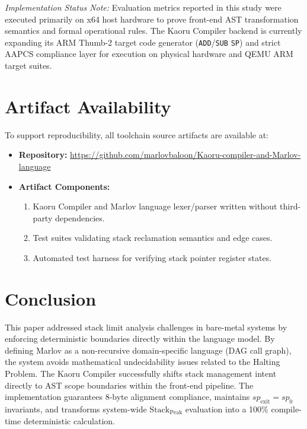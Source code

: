 \documentclass[conference]{IEEEtran}
\begin{document}
\textit{Implementation Status Note:} Evaluation metrics reported in this study were executed primarily on x64 host hardware to prove front-end AST transformation semantics and formal operational rules. The Kaoru Compiler backend is currently expanding its ARM Thumb-2 target code generator (\texttt{ADD}/\texttt{SUB} \texttt{SP}) and strict AAPCS compliance layer for execution on physical hardware and QEMU ARM target suites.

\section{Artifact Availability}
To support reproducibility, all toolchain source artifacts are available at:
\begin{itemize}
    \item \textbf{Repository:} \url{https://github.com/marlovbaloon/Kaoru-compiler-and-Marlov-language}
    \item \textbf{Artifact Components:}
    \begin{enumerate}
        \item Kaoru Compiler and Marlov language lexer/parser written without third-party dependencies.
        \item Test suites validating stack reclamation semantics and edge cases.
        \item Automated test harness for verifying stack pointer register states.
    \end{enumerate}
\end{itemize}

\section{Conclusion}
This paper addressed stack limit analysis challenges in bare-metal systems by enforcing deterministic boundaries directly within the language model. By defining Marlov as a non-recursive domain-specific language (DAG call graph), the system avoids mathematical undecidability issues related to the Halting Problem. The Kaoru Compiler successfully shifts stack management intent directly to AST scope boundaries within the front-end pipeline. The implementation guarantees 8-byte alignment compliance, maintains $sp_{\text{exit}} = sp_0$ invariants, and transforms system-wide $\mathrm{Stack}_{\mathrm{Peak}}$ evaluation into a 100\% compile-time deterministic calculation.
\end{document}
